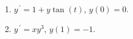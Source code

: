 \documentclass{ximera}
\begin{document}
\begin{enumerate}
\begin{enumerate}
\item $y^{\,\prime}=1+y\tan{(t)}$, $y(0)=0$.

\vfill

\hfill{}


\item $y^{\,\prime}=xy^3$, $y(1)=-1$.

\vfill

\hfill{}














\end{enumerate}


\end{enumerate}

    
\end{document}
